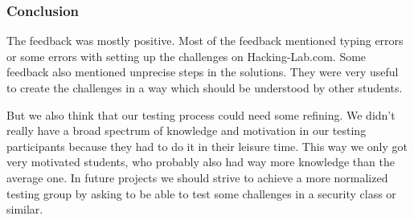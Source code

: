 \subsubsection{Conclusion}
The feedback was mostly positive. Most of the feedback mentioned typing errors or some errors with setting up the challenges on Hacking-Lab.com. Some feedback also mentioned unprecise steps in the solutions. They were very useful to create the challenges in a way which should be understood by other students.

But we also think that our testing process could need some refining. We didn't really have a broad spectrum of knowledge and motivation in our testing participants because they had to do it in their leisure time. This way we only got very motivated students, who probably also had way more knowledge than the average one. In future projects we should strive to achieve a more normalized testing group by asking to be able to test some challenges in a security class or similar.
